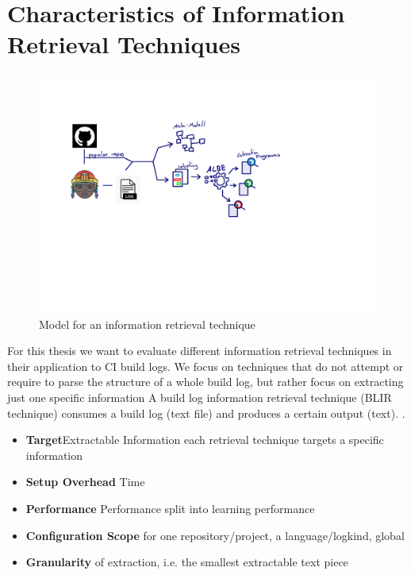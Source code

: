 \documentclass[\myrootdir/main.tex]{subfiles}
\begin{document}
\section{Characteristics of Information Retrieval Techniques}
\begin{figure}[h]
	\centering
	\includegraphics[page=3, width=\textwidth, trim={0.5cm 0.5cm 0.5cm 0.5cm}, clip]{img/flow-of-research.pdf}
	\caption{Model for an information retrieval technique}
	\label{fig:model-ie-technique}
\end{figure}
For this thesis we want to evaluate different information retrieval techniques in their application to CI build logs. We focus on techniques that do not attempt or require to parse the structure of a whole build log, but rather focus on extracting just one specific information
A build log information retrieval technique (BLIR technique) consumes a build log (text file) and produces a certain output (text). .
\begin{itemize}
	\item \textbf{Target}{Extractable Information} each retrieval technique  targets a specific information
	\item \textbf{Setup Overhead} {Time}
	\item \textbf{Performance} {Performance} split into learning performance
	\item \textbf{Configuration Scope} for one repository/project, a language/logkind, global
	\item \textbf{Granularity} of extraction, i.e. the smallest extractable text piece
\end{itemize}
\end{document}
